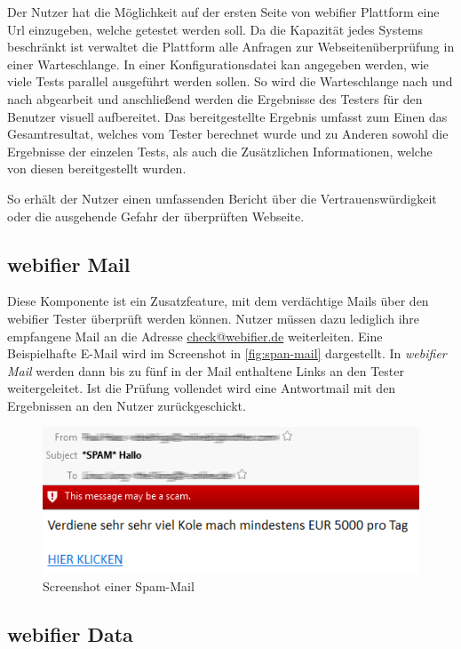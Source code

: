 Der Nutzer hat die Möglichkeit auf der ersten Seite von webifier Plattform eine Url einzugeben, welche getestet werden soll. Da die Kapazität jedes Systems beschränkt ist verwaltet die Plattform alle Anfragen zur Webseitenüberprüfung in einer Warteschlange. In einer Konfigurationsdatei kan angegeben werden, wie viele Tests parallel ausgeführt werden sollen. So wird die Warteschlange nach und nach abgearbeit und anschließend werden die Ergebnisse des Testers für den Benutzer visuell aufbereitet. Das bereitgestellte Ergebnis umfasst zum Einen das Gesamtresultat, welches vom Tester berechnet wurde und zu Anderen sowohl die Ergebnisse der einzelen Tests, als auch die Zusätzlichen Informationen, welche von diesen bereitgestellt wurden.

So erhält der Nutzer einen umfassenden Bericht über die Vertrauenswürdigkeit oder die ausgehende Gefahr der überprüften Webseite.

\subsection{webifier Mail}
Diese Komponente ist ein Zusatzfeature, mit dem verdächtige Mails über den webifier Tester überprüft werden können.
Nutzer müssen dazu lediglich ihre empfangene Mail an die Adresse \href{mailto:check@webifier.de}{check@webifier.de} weiterleiten.
Eine Beispielhafte E-Mail wird im Screenshot in \autoref{fig:span-mail} dargestellt.
In \textit{webifier Mail} werden dann bis zu fünf in der Mail enthaltene Links an den Tester weitergeleitet.
Ist die Prüfung vollendet wird eine Antwortmail mit den Ergebnissen an den Nutzer zurückgeschickt.

\begin{figure}[H]
	\centering
	\includegraphics[width=\textwidth]{images/spam-mail.png}
	\caption{Screenshot einer Spam-Mail}
	\label{fig:spam-mail}
\end{figure}

\subsection{webifier Data}
\label{sec:konzept-data}

